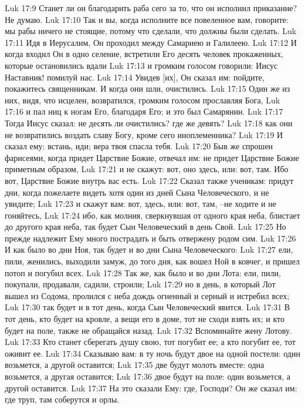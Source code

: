 Luk 17:9  Станет ли он благодарить раба сего за то, что он исполнил приказание? Не думаю.
Luk 17:10  Так и вы, когда исполните все повеленное вам, говорите: мы рабы ничего не стоящие, потому что сделали, что должны были сделать.
Luk 17:11  Идя в Иерусалим, Он проходил между Самариею и Галилеею.
Luk 17:12  И когда входил Он в одно селение, встретили Его десять человек прокаженных, которые остановились вдали
Luk 17:13  и громким голосом говорили: Иисус Наставник! помилуй нас.
Luk 17:14  Увидев [их], Он сказал им: пойдите, покажитесь священникам. И когда они шли, очистились.
Luk 17:15  Один же из них, видя, что исцелен, возвратился, громким голосом прославляя Бога,
Luk 17:16  и пал ниц к ногам Его, благодаря Его; и это был Самарянин.
Luk 17:17  Тогда Иисус сказал: не десять ли очистились? где же девять?
Luk 17:18  как они не возвратились воздать славу Богу, кроме сего иноплеменника?
Luk 17:19  И сказал ему: встань, иди; вера твоя спасла тебя.
Luk 17:20  Быв же спрошен фарисеями, когда придет Царствие Божие, отвечал им: не придет Царствие Божие приметным образом,
Luk 17:21  и не скажут: вот, оно здесь, или: вот, там. Ибо вот, Царствие Божие внутрь вас есть.
Luk 17:22  Сказал также ученикам: придут дни, когда пожелаете видеть хотя один из дней Сына Человеческого, и не увидите;
Luk 17:23  и скажут вам: вот, здесь, или: вот, там, --не ходите и не гоняйтесь,
Luk 17:24  ибо, как молния, сверкнувшая от одного края неба, блистает до другого края неба, так будет Сын Человеческий в день Свой.
Luk 17:25  Но прежде надлежит Ему много пострадать и быть отвержену родом сим.
Luk 17:26  И как было во дни Ноя, так будет и во дни Сына Человеческого:
Luk 17:27  ели, пили, женились, выходили замуж, до того дня, как вошел Ной в ковчег, и пришел потоп и погубил всех.
Luk 17:28  Так же, как было и во дни Лота: ели, пили, покупали, продавали, садили, строили;
Luk 17:29  но в день, в который Лот вышел из Содома, пролился с неба дождь огненный и серный и истребил всех;
Luk 17:30  так будет и в тот день, когда Сын Человеческий явится.
Luk 17:31  В тот день, кто будет на кровле, а вещи его в доме, тот не сходи взять их; и кто будет на поле, также не обращайся назад.
Luk 17:32  Вспоминайте жену Лотову.
Luk 17:33  Кто станет сберегать душу свою, тот погубит ее; а кто погубит ее, тот оживит ее.
Luk 17:34  Сказываю вам: в ту ночь будут двое на одной постели: один возьмется, а другой оставится;
Luk 17:35  две будут молоть вместе: одна возьмется, а другая оставится;
Luk 17:36  двое будут на поле: один возьмется, а другой оставится.
Luk 17:37  На это сказали Ему: где, Господи? Он же сказал им: где труп, там соберутся и орлы.
